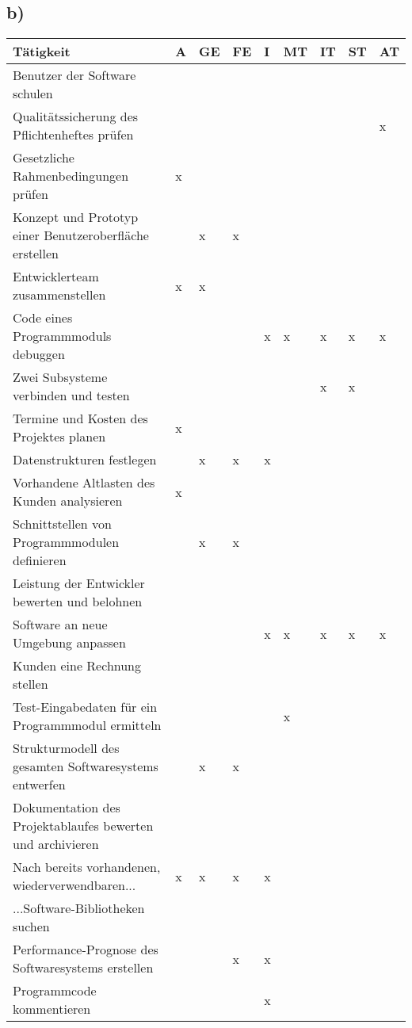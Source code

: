 \documentclass[a4paper,11pt]{scrartcl}
\begin{document}
	\subsection*{b)}
	\begin{table}[h!]
		\begin{tabular}{l|l|l|l|l|l|l|l|l}
		 \textbf{Tätigkeit} 										&A &GE&FE&I &MT&IT&ST&AT \\ 
		 \hline
		 Benutzer der Software schulen								&  &  &  &  &  &  &  &  \\
		 Qualitätssicherung des Pflichtenheftes prüfen				&  &  &  &  &  &  &  &x \\
		 Gesetzliche Rahmenbedingungen prüfen						&x &  &  &  &  &  &  &  \\
		 Konzept und Prototyp einer Benutzeroberfläche erstellen	&  &x &x &  &  &  &  &  \\
		 Entwicklerteam zusammenstellen								&x &x &  &  &  &  &  &  \\
		 Code eines Programmmoduls debuggen							&  &  &  &x &x &x &x &x \\
 		 Zwei Subsysteme verbinden und testen						&  &  &  &  &  &x &x &  \\
 		 Termine und Kosten des Projektes planen					&x &  &  &  &  &  &  &  \\
		 Datenstrukturen festlegen									&  &x &x &x &  &  &  &  \\
		 Vorhandene Altlasten des Kunden analysieren				&x &  &  &  &  &  &  &  \\
		 Schnittstellen von Programmmodulen definieren				&  &x &x &  &  &  &  &  \\
		 Leistung der Entwickler bewerten und belohnen				&  &  &  &  &  &  &  &  \\
		 Software an neue Umgebung anpassen							&  &  &  &x &x &x &x &x \\
		 Kunden eine Rechnung stellen								&  &  &  &  &  &  &  &  \\
		 Test-Eingabedaten für ein Programmmodul ermitteln			&  &  &  &  &x &  &  &  \\ 
		 Strukturmodell des gesamten Softwaresystems entwerfen		&  &x &x &  &  &  &  &  \\
		 Dokumentation des Projektablaufes bewerten und archivieren	&  &  &  &  &  &  &  &  \\
		 Nach bereits vorhandenen, wiederverwendbaren...			&x &x &x &x &  &  &  &  \\
		 \hspace*{10mm} ...Software-Bibliotheken suchen             &  &  &  &  &  &  &  &  \\ 	
		 Performance-Prognose des Softwaresystems erstellen			&  &  &x &x &  &  &  &  \\
		 Programmcode kommentieren									&  &  &  &x &  &  &  &  \\ 
		\end{tabular}
	\end{table}
\end{document}
